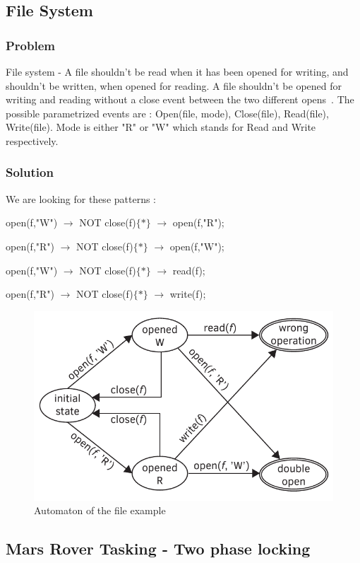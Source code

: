 		\subsection{File System}
			\subsubsection{Problem}
				File system - A file shouldn't be read when it has been opened for writing, and shouldn't be written, when opened for reading. 
				A file shouldn't be opened for writing and reading without a close event between the two different opens~\citep{marq}.
				The possible parametrized events are : 
				Open(file, mode), 
				Close(file), 
				Read(file), 
				Write(file). 
				Mode is either "R" or "W" which stands for Read and Write respectively.
			\subsubsection{Solution}
				We are looking for these patterns : 
				
				open(f,"W") $\rightarrow$ NOT close(f)$\{\ast\}$ $\rightarrow$ open(f,"R");
				
				open(f,"R") $\rightarrow$ NOT close(f)$\{\ast\}$ $\rightarrow$ open(f,"W");
				
				open(f,"W") $\rightarrow$ NOT close(f)$\{\ast\}$ $\rightarrow$ read(f);
				
				open(f,"R") $\rightarrow$ NOT close(f)$\{\ast\}$ $\rightarrow$ write(f);
				
				\begin{figure}[h]
				\centering
				\includegraphics[width=0.7\linewidth]{include/figures/chapter_5/file_example_aut}
				\caption{Automaton of the file example}
				\label{fig:cep:fileautomaton}
				\end{figure}

		
		
		\subsection{Mars Rover Tasking - Two phase locking}

